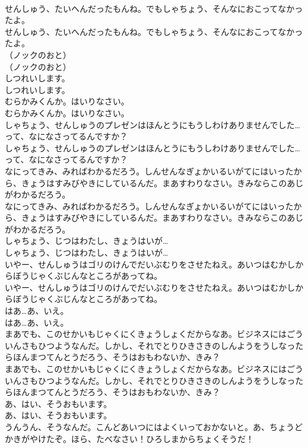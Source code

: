 \documentclass[8pt]{extreport}
\begin{document}
\begin{CJK}{UTF8}{min}
\\	せんしゅう、たいへんだったもんね。でもしゃちょう、そんなにおこってなかったよ。
\\	せんしゅう、たいへんだったもんね。でもしゃちょう、そんなにおこってなかったよ。
\\	（ノックのおと）
\\	（ノックのおと）
\\	しつれいします。
\\	しつれいします。
\\	むらかみくんか。はいりなさい。
\\	むらかみくんか。はいりなさい。
\\	しゃちょう、せんしゅうのプレゼンはほんとうにもうしわけありませんでした…って、なになさってるんですか？
\\	しゃちょう、せんしゅうのプレゼンはほんとうにもうしわけありませんでした…って、なになさってるんですか？
\\	なにってきみ、みればわかるだろう。しんせんなぎょかいるいがてにはいったから、きょうはすみびやきにしているんだ。まあすわりなさい。きみならこのあじがわかるだろう。
\\	なにってきみ、みればわかるだろう。しんせんなぎょかいるいがてにはいったから、きょうはすみびやきにしているんだ。まあすわりなさい。きみならこのあじがわかるだろう。
\\	しゃちょう、じつはわたし、きょうはいが…
\\	しゃちょう、じつはわたし、きょうはいが…
\\	いやー、せんしゅうはゴリのけんでだいぶむりをさせたねえ。あいつはむかしからぼうじゃくぶじんなところがあってね。
\\	いやー、せんしゅうはゴリのけんでだいぶむりをさせたねえ。あいつはむかしからぼうじゃくぶじんなところがあってね。
\\	はあ…あ、いえ。
\\	はあ…あ、いえ。
\\	まあでも、このせかいもじゃくにくきょうしょくだからなあ。ビジネスにはごういんさもひつようなんだ。しかし、それでとりひきさきのしんようをうしなったらほんまつてんとうだろう、そうはおもわないか、きみ？
\\	まあでも、このせかいもじゃくにくきょうしょくだからなあ。ビジネスにはごういんさもひつようなんだ。しかし、それでとりひきさきのしんようをうしなったらほんまつてんとうだろう、そうはおもわないか、きみ？
\\	あ、はい、そうおもいます。
\\	あ、はい、そうおもいます。
\\	うんうん、そうなんだ。こんどあいつにはよくいっておかないと。あ、ちょうどかきがやけたぞ。ほら、たべなさい！ひろしまからちょくそうだ！

\end{CJK}
\end{document}
